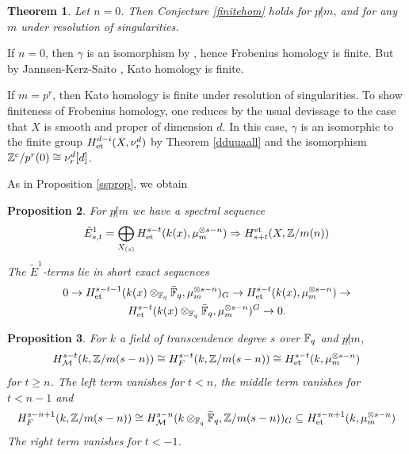 \documentclass[nospthms,envcountsect]{svmult} %
\newtheorem{theorem}                    {Theorem}       [section]
\newtheorem{proposition}[theorem]       {Proposition}
\begin{document}
\begin{theorem}\label{KJS} Let $n=0$. Then 
Conjecture \ref{finitehom} holds for $p\not| m$, and for any $m$
under resolution of singularities.
\end{theorem}

\proof
If $n=0$, then $\gamma$ is an isomorphism by \cite{ichduality}, hence
Frobenius homology is finite. But by Jannsen-Kerz-Saito \cite{kerzsaito},
Kato homology is finite. 

If $m=p^r$, then Kato homology is finite under resolution of 
singularities. To show finiteness of Frobenius homology, one reduces by the usual devissage to the case that $X$ is smooth and proper of dimension $d$. 
In this case, $\gamma$ is an isomorphic to the finite group
$H^{d-i}_{\text{\rm et}}(X,\nu^{d}_r)$ by Theorem \ref{dduuaall} and the isomorphism 
${{\mathbb Z}}^c/p^r(0) \cong \nu^d_r[d]$.
\proofend 


As in Proposition \ref{ssprop}, we obtain 

\begin{proposition} 
For $p\not| m$ we have a spectral sequence
\begin{equation}\label{polk}
\tilde E^1_{s,t}=\bigoplus_{X_{(s)}}
H^{s-t}_{\text{\rm et}}(k(x),\mu_m^{\otimes s-n})
\Rightarrow H_{s+t}^{\text{\rm et}}(X,{{\mathbb Z}}/m(n))
\end{equation}
The $\tilde E^1$-terms lie in short exact sequences
\begin{multline}\label{galoismodm}
0\to H^{s-t-1}_{\text{\rm et}}(k(x)\otimes_{{{\mathbb F}}_q}\bar {{{\mathbb F}}}_q,\mu_m^{\otimes s-n})_G
\to H^{s-t}_{\text{\rm et}}(k(x),\mu_m^{\otimes s-n})\to \\ 
H^{s-t}_{\text{\rm et}}(k(x)\otimes_{{{\mathbb F}}_q}\bar {{{\mathbb F}}}_q,\mu_m^{\otimes s-n})^G\to  0. 
\end{multline}
\end{proposition}




\begin{proposition}\label{polk1}
For $k$ a field of transcendence degree $s$ over ${{\mathbb F}}_q$ and $p\not|m$, 
$$H^{s-t}_{\mathcal M}(k,{{\mathbb Z}}/m(s-n))\cong  H^{s-t}_F(k,{{\mathbb Z}}/m(s-n))
\cong H^{s-t}_{\text{\rm et}}(k,\mu_m^{\otimes s-n})
$$
for $t\geq n$. The left term vanishes for $t<n$, the middle
term vanishes for $t<n-1$ and 
$$H^{s-n+1}_F(k,{{\mathbb Z}}/m(s-n))\cong 
H^{s-n}_{\mathcal M}(k\otimes_{{{\mathbb F}}_q}\bar {{{\mathbb F}}}_q,{{\mathbb Z}}/m(s-n))_G
\subseteq H^{s-n+1}_{\text{\rm et}}(k,\mu_m^{\otimes s-n})$$
The right term vanishes for $t<-1$.
\end{proposition}
\end{document}
